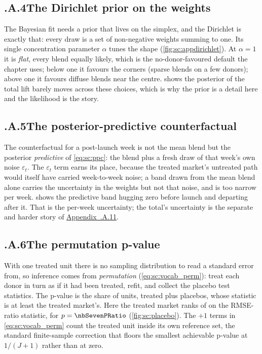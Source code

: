 \subsection*{\thechapter.A.4\quad The Dirichlet prior on the weights}
\label{app:sc:dirichlet}
The Bayesian fit needs a prior that lives on the simplex, and the Dirichlet is exactly that: every
draw is a set of non-negative weights summing to one. Its single concentration parameter $\alpha$
tunes the shape (\cref{fig:sc:appdirichlet}). At $\alpha = 1$ it is \emph{flat}, every blend equally
likely, which is the no-donor-favoured default the chapter uses; below one it favours the corners
(sparse blends on a few donors); above one it favours diffuse blends near the centre.
 shows the posterior of the total lift barely moves across these choices, which
is why the prior is a detail here and the likelihood is the story.


\subsection*{\thechapter.A.5\quad The posterior-predictive counterfactual}
\label{app:sc:ppc}
The counterfactual for a post-launch week is not the mean blend but the posterior \emph{predictive} of
\cref{eq:sc:ppc}: the blend plus a fresh draw of that week's own noise $\varepsilon_t$. The
$\varepsilon_t$ term earns its place, because the treated market's untreated path would itself have
carried week-to-week noise; a band drawn from the mean blend alone carries the uncertainty in the
weights but not that noise, and is too narrow per week.  shows the predictive band
hugging zero before launch and departing after it. That is the per-week uncertainty; the total's
uncertainty is the separate and harder story of \hyperref[app:sc:acf]{Appendix~\thechapter.A.11}.

\subsection*{\thechapter.A.6\quad The permutation p-value}
\label{app:sc:perm}
With one treated unit there is no sampling distribution to read a standard error from, so inference
comes from \emph{permutation} (\cref{eq:sc:vocab_perm}): treat each donor in turn as if it had been
treated, refit, and collect the placebo test statistics. The p-value is the share of units, treated
plus placebos, whose statistic is at least the treated market's. Here the treated market ranks
\nbSevenTreatedRank{} of \nbSevenNUnits{} on the RMSE-ratio statistic, for $p = \nbSevenPRatio$
(\cref{fig:sc:placebo}). The $+1$ terms in \cref{eq:sc:vocab_perm} count the treated unit inside its
own reference set, the standard finite-sample correction that floors the smallest achievable p-value
at $1/(J{+}1)$ rather than at zero.

